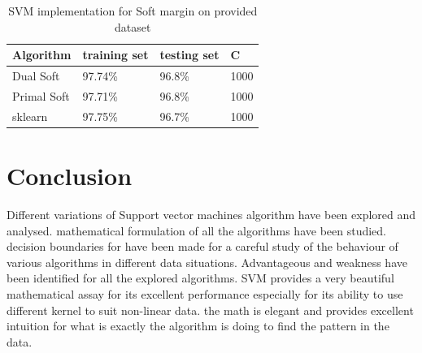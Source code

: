 \documentclass[10pt,twocolumn,letterpaper]{article}
\begin{document}
\begin{table}[htb]
\centering
\begin{tabular}{|l|l|l|l|} 
\toprule
Algorithm   & training set & testing set & C     \\ 
\hline
Dual Soft   & 97.74\%      & 96.8\%      & 1000  \\ 
\hline
Primal Soft & 97.71\%      & 96.8\%      & 1000  \\ 
\hline
sklearn     & 97.75\%      & 96.7\%      & 1000  \\
\bottomrule
\end{tabular}
\caption{SVM implementation for Soft margin on provided dataset}
\label{tab:SVM_soft_data}
\end{table}

\section{Conclusion}
Different variations of Support vector machines algorithm have been explored and analysed. mathematical formulation of all the algorithms have been studied. decision boundaries for have been made for a careful study of the behaviour of various algorithms in different data situations. Advantageous and weakness have been identified for all the explored algorithms. SVM provides a very beautiful mathematical assay for its excellent performance especially for its ability to use different kernel to suit non-linear data. the math is elegant and provides excellent intuition for what is exactly the algorithm is doing to find the pattern in the data. 


 

\end{document}

